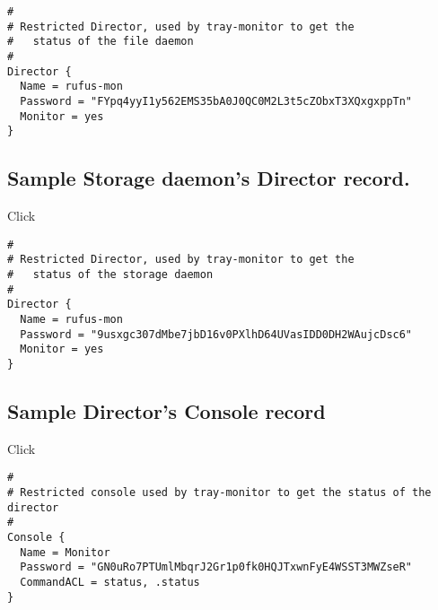 \footnotesize
\begin{verbatim}
#
# Restricted Director, used by tray-monitor to get the
#   status of the file daemon
#
Director {
  Name = rufus-mon
  Password = "FYpq4yyI1y562EMS35bA0J0QC0M2L3t5cZObxT3XQxgxppTn"
  Monitor = yes
}
\end{verbatim}
\normalsize

\subsection{Sample Storage daemon's Director record.}

Click

\footnotesize
\begin{verbatim}
#
# Restricted Director, used by tray-monitor to get the
#   status of the storage daemon
#
Director {
  Name = rufus-mon
  Password = "9usxgc307dMbe7jbD16v0PXlhD64UVasIDD0DH2WAujcDsc6"
  Monitor = yes
}
\end{verbatim}
\normalsize

\subsection{Sample Director's Console record}

Click

\footnotesize
\begin{verbatim}
#
# Restricted console used by tray-monitor to get the status of the director
#
Console {
  Name = Monitor
  Password = "GN0uRo7PTUmlMbqrJ2Gr1p0fk0HQJTxwnFyE4WSST3MWZseR"
  CommandACL = status, .status
}
\end{verbatim}
\normalsize
